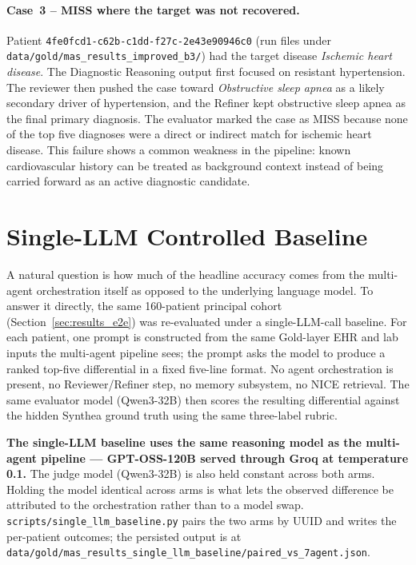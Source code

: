 \paragraph{Case~3 -- MISS where the target was not recovered.}
\begingroup\sloppy
Patient
\texttt{4fe0fcd1-\allowbreak c62b-\allowbreak c1dd-\allowbreak f27c-\allowbreak 2e43e90946c0}
(run files under
\texttt{data/\allowbreak gold/\allowbreak mas\_\allowbreak results\_\allowbreak improved\_\allowbreak b3/})
had the target disease
\textit{Ischemic heart disease}. The Diagnostic Reasoning output first focused
on resistant hypertension. The reviewer then pushed the case toward
\textit{Obstructive sleep apnea} as a likely secondary driver of hypertension,
and the Refiner kept obstructive sleep apnea as the final primary diagnosis.
The evaluator marked the case as MISS because none of the top five diagnoses
were a direct or indirect match for ischemic heart disease. This failure shows
a common weakness in the pipeline: known cardiovascular history can be treated
as background context instead of being carried forward as an active diagnostic
candidate.
\par\endgroup

\section{Single-LLM Controlled Baseline}
\label{sec:results_single_llm}

A natural question is how much of the headline accuracy comes from
the multi-agent orchestration itself as opposed to the underlying
language model. To answer it directly, the same 160-patient principal
cohort (Section~\ref{sec:results_e2e}) was re-evaluated under a
single-LLM-call baseline. For each patient, one prompt is constructed
from the same Gold-layer EHR and lab inputs the multi-agent pipeline
sees; the prompt asks the model to produce a ranked top-five
differential in a fixed five-line format. No agent orchestration is
present, no Reviewer/Refiner step, no memory subsystem, no NICE
retrieval. The same evaluator model (Qwen3-32B) then scores the
resulting differential against the hidden Synthea ground truth using
the same three-label rubric.

\textbf{The single-LLM baseline uses the same reasoning model as the
multi-agent pipeline --- GPT-OSS-120B served through Groq at
temperature 0.1.} The judge model (Qwen3-32B) is also held constant
across both arms. Holding the model identical across arms is what
lets the observed difference be attributed to the orchestration
rather than to a model swap.
\texttt{scripts/single\_llm\_baseline.py} pairs the two arms by UUID
and writes the per-patient outcomes; the persisted output is at
\texttt{data/gold/mas\_results\_single\_llm\_baseline/paired\_vs\_7agent.json}.

